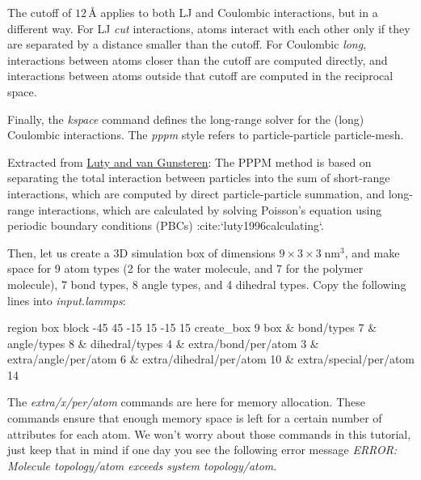 \begin{tcolorbox}[colback=mylightblue!5!white,colframe=mylightblue!75!black,title=About cutoff in molecular dynamics]

\vspace{0.25cm} \noindent The cutoff of $12\,\text{Å}$ applies to both LJ and Coulombic
interactions, but in a different way. For LJ \textit{cut}
interactions, atoms interact with each other only if they
are separated by a distance smaller than the cutoff. For
Coulombic \textit{long}, interactions between atoms closer than
the cutoff are computed directly, and interactions between
atoms outside that cutoff are computed in the reciprocal space.
\end{tcolorbox}

\noindent Finally, the \textit{kspace} command defines the long-range solver for the (long)
Coulombic interactions. The \textit{pppm} style refers to
particle-particle particle-mesh.

\begin{tcolorbox}[colback=mylightblue!5!white,colframe=mylightblue!75!black,title=About PPPM]

\vspace{0.25cm} \noindent Extracted from \href{https://doi.org/10.1021/jp9518623}{Luty and van Gunsteren}:
The PPPM method is based on separating the total interaction
between particles into the sum of short-range
interactions, which are computed by direct
particle-particle summation, and long-range interactions,
which are calculated by solving Poisson's equation using
periodic boundary conditions (PBCs) :cite:`luty1996calculating`.
\end{tcolorbox}

\noindent Then, let us create a 3D simulation box of dimensions $9 \times 3 \times 3 \; \text{nm}^3$,
and make space for 9 atom types (2 for
the water molecule, and 7 for the polymer molecule), 7 bond types, 8
angle types, and 4 dihedral types.
Copy the following lines into \textit{input.lammps}:

\begin{lcverbatim}
region box block -45 45 -15 15 -15 15
create_box 9 box &
bond/types 7 &
angle/types 8 &
dihedral/types 4 &
extra/bond/per/atom 3 &
extra/angle/per/atom 6 &
extra/dihedral/per/atom 10 &
extra/special/per/atom 14
\end{lcverbatim}

\noindent \begin{tcolorbox}[colback=mylightblue!5!white,colframe=mylightblue!75!black,title=About extra per atom commands]

\vspace{0.25cm} \noindent The \textit{extra/x/per/atom} commands are here for
memory allocation. These commands ensure that enough memory space is left for a
certain number of attributes for each atom. We won't worry
about those commands in this tutorial, just keep that in mind if one day
you see the following error
message \textit{ERROR: Molecule topology/atom exceeds system topology/atom}.
\end{tcolorbox}

